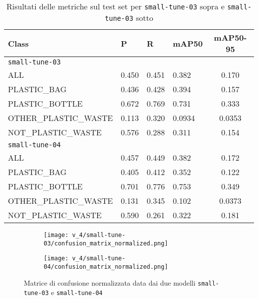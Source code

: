     \begin{table}[!htbp]
        \centering
        \begin{tabularx}{\textwidth}{lYYYc}
            \toprule
            Class & P & R & mAP50 & mAP50-95 \\
            \midrule
            \texttt{small-tune-03} \\
            \midrule
            ALL & 0.450 & 0.451 & 0.382 & 0.170 \\
            PLASTIC\_BAG & 0.436 & 0.428 & 0.394 & 0.157 \\
            PLASTIC\_BOTTLE & 0.672 & 0.769 & 0.731 & 0.333 \\
            OTHER\_PLASTIC\_WASTE & 0.113 & 0.320 & 0.0934 & 0.0353 \\
            NOT\_PLASTIC\_WASTE & 0.576 & 0.288 & 0.311 & 0.154 \\
            \midrule
            \texttt{small-tune-04} \\
            \midrule
            ALL & 0.457 & 0.449 & 0.382 & 0.172 \\
            PLASTIC\_BAG & 0.405 & 0.412 & 0.352 & 0.122 \\
            PLASTIC\_BOTTLE & 0.701 & 0.776 & 0.753 & 0.349 \\
            OTHER\_PLASTIC\_WASTE & 0.131 & 0.345 & 0.102 & 0.0373 \\
            NOT\_PLASTIC\_WASTE & 0.590 & 0.261 & 0.322 & 0.181 \\
            \bottomrule
        \end{tabularx}
        \caption{Risultati delle metriche sul test set per \texttt{small-tune-03} sopra e \texttt{small-tune-03} sotto}
        \label{table:v4-1}
    \end{table}

    \begin{figure}[!htb]
        \centering
        \begin{subfigure}{.49\textwidth}
            \texttt{[image: v\_4/small-tune-03/confusion\_matrix\_normalized.png]}
            \label{fig:v4-4.1}
        \end{subfigure}
        \begin{subfigure}{.49\textwidth}
            \texttt{[image: v\_4/small-tune-04/confusion\_matrix\_normalized.png]}
            \label{fig:v4-4.1}
        \end{subfigure}
        \caption{Matrice di confusione normalizzata data dai due modelli \texttt{small-tune-03} e \texttt{small-tune-04}}
        \label{fig:v4-4}
    \end{figure}

